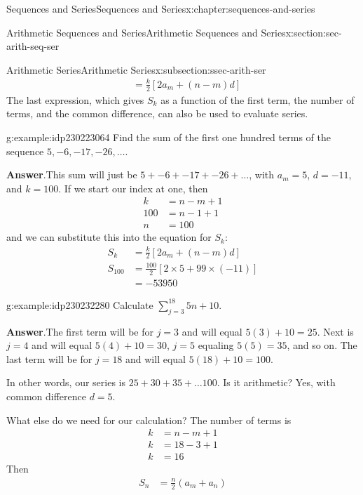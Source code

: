 \documentclass[twoside,10pt,]{book}
\newcommand{\blocktitlefont}{\relax}
\numberwithin{equation}{section}
\newcommand{\amp}{&}
\begin{document}
\begin{chapterptx}{Sequences and Series}{}{Sequences and Series}{}{}{x:chapter:sequences-and-series}
\begin{sectionptx}{Arithmetic Sequences and Series}{}{Arithmetic Sequences and Series}{}{}{x:section:sec-arith-seq-ser}
\begin{subsectionptx}{Arithmetic Series}{}{Arithmetic Series}{}{}{x:subsection:ssec-arith-ser}
\begin{align*}
\amp = \frac{k}{2}\left[ 2a_m + \left( n - m \right)d \right]
\end{align*}
The last expression, which gives \(S_k\) as a function of the first term, the number of terms, and the common difference, can also be used to evaluate series. \begin{example}{}{g:example:idp230223064}%
Find the sum of the first one hundred terms of the sequence \(5, -6, -17, -26, \ldots\).\par\smallskip%
\noindent\textbf{\blocktitlefont Answer}.\label{g:answer:idp230225240}{}\hypertarget{g:answer:idp230225240}{}\quad{}This sum will just be \(5 + -6 + -17 +  -26 + \ldots\), with \(a_m = 5\), \(d = -11\), and \(k = 100\).  If we start our index at one, then%
\begin{align*}
k \amp = n - m + 1\\
100 \amp = n - 1 + 1\\
n\amp = 100
\end{align*}
and we can substitute this into the equation for \(S_k\):%
\begin{align*}
S_k \amp = \frac{k}{2}\left[ 2a_m + \left( n - m \right)d \right]\\
S_{100} \amp = \frac{100}{2}\left[ 2 \times 5 + 99 \times \left(  - 11 \right) \right]\\
\amp =  - 53950
\end{align*}
\end{example}
 \begin{example}{}{g:example:idp230232280}%
Calculate \(\sum\limits_{j = 3}^{18} {5n + 10}\).\par\smallskip%
\noindent\textbf{\blocktitlefont Answer}.\label{g:answer:idp230232664}{}\hypertarget{g:answer:idp230232664}{}\quad{}The first term will be for \(j=3\) and will equal \(5(3)+10=25\).  Next is \(j=4\) and will equal \(5(4)+10=30\), \(j=5\) equaling \(5(5)=35\), and so on.   The last term will be for \(j=18\) and will equal \(5(18)+10=100\).%
\par
In other words, our series is \(25+30+35+\ldots 100\).  Is it arithmetic?  Yes, with common difference \(d = 5\).%
\par
What else do we need for our calculation?  The number of terms is%
\begin{align*}
k \amp = n-m+1\\
k \amp = 18-3+1\\
k\amp = 16
\end{align*}
Then%
\begin{align*}
S_n \amp = \frac{n}{2}\left(a_m + a_n \right)\\

\end{align*}
\end{example}
\end{subsectionptx}
\end{sectionptx}
\end{chapterptx}
\end{document}
